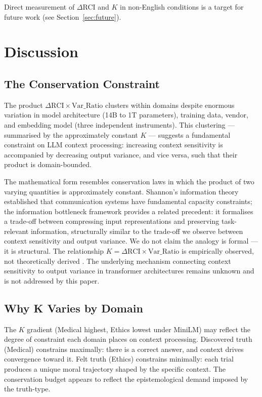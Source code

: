 \documentclass[11pt,a4paper]{article}
\begin{document}
Direct measurement of $\Delta$RCI and $K$ in non-English conditions is a target for
future work (see Section~\ref{sec:future}).

\section{Discussion}

\subsection{The Conservation Constraint}

The product $\Delta\text{RCI} \times \text{Var\_Ratio}$ clusters within domains despite
enormous variation in model architecture (14B to 1T parameters), training data, vendor,
and embedding model (three independent instruments). This clustering --- summarised by
the approximately constant $K$ --- suggests a fundamental constraint on LLM context
processing: increasing context sensitivity is accompanied by decreasing output variance,
and vice versa, such that their product is domain-bounded.

The mathematical form resembles conservation laws in which the product of two varying
quantities is approximately constant. Shannon's information theory \citep{shannon1948}
established that communication systems have fundamental capacity constraints; the
information bottleneck framework
\citep{tishby2015,saxe2019,kawaguchi2023bottleneck} provides a related
precedent: it formalises a trade-off between compressing input representations and
preserving task-relevant information, structurally similar to the trade-off we observe
between context sensitivity and output variance. We do not claim the analogy is formal ---
it is structural. The relationship $K = \Delta\text{RCI} \times \text{Var\_Ratio}$
is empirically observed, not theoretically derived \citep{bahri2024scaling}. The
underlying mechanism connecting context sensitivity to output variance in transformer
architectures \citep{vaswani2017,hoffmann2022,fedus2022switch} remains unknown and is
not addressed by this paper.

\subsection{Why K Varies by Domain}

The $K$ gradient (Medical highest, Ethics lowest under MiniLM) may reflect the degree
of constraint each domain places on context processing. Discovered truth (Medical)
constrains maximally: there is a correct answer, and context drives convergence toward
it. Felt truth (Ethics) constrains minimally: each trial produces a unique moral
trajectory shaped by the specific context. The conservation budget appears to reflect
the epistemological demand imposed by the truth-type.
\end{document}

